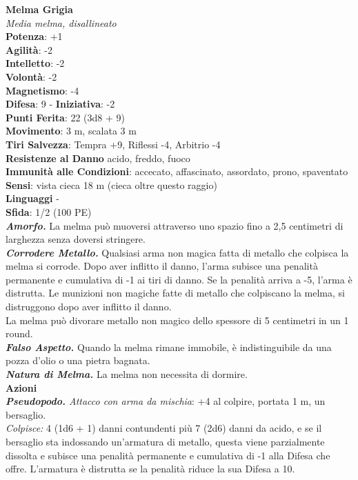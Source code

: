 \begin{multicols}{2}
\medskip\textbf{Melma Grigia}\\
\emph{Media melma, disallineato}\\
\textbf{Potenza}: +1\\
\textbf{Agilità}: -2\\
\textbf{Intelletto}: -2\\
\textbf{Volontà}: -2\\
\textbf{Magnetismo}: -4\\
\textbf{Difesa}: 9 - \textbf{Iniziativa}: -2\\
\textbf{Punti Ferita}: 22 (3d8 + 9)\\
\textbf{Movimento}: 3 m, scalata 3 m\\
\textbf{Tiri Salvezza}: Tempra +9, Riflessi -4, Arbitrio -4\\
\textbf{Resistenze al Danno} acido, freddo, fuoco\\
\textbf{Immunità alle Condizioni}: accecato, affascinato, assordato, prono, spaventato
\textbf{Sensi}: vista cieca 18 m (cieca oltre questo raggio)\\
\textbf{Linguaggi} -\\
\textbf{Sfida}: 1/2 (100 PE)\smallskip\\
\emph{\textbf{Amorfo.}} La melma può muoversi attraverso uno spazio fino a 2,5 centimetri di larghezza senza doversi stringere.\\
\emph{\textbf{Corrodere Metallo.}} Qualsiasi arma non magica fatta di metallo che colpisca la melma si corrode. Dopo aver inflitto il danno, l'arma subisce una penalità permanente e cumulativa di -1 ai tiri di danno. Se la penalità arriva a -5, l'arma è distrutta. Le munizioni non magiche fatte di metallo che colpiscano la melma, si distruggono dopo aver inflitto il danno.\\
La melma può divorare metallo non magico dello spessore di 5 centimetri in un 1 round.\\
\emph{\textbf{Falso Aspetto.}} Quando la melma rimane immobile, è indistinguibile da una pozza d'olio o una pietra bagnata.\\
\emph{\textbf{Natura di Melma.}} La melma non necessita di dormire. \\
\smallskip\textbf{Azioni}\\
\emph{\textbf{Pseudopodo.} Attacco con arma da mischia}: +4 al colpire, portata 1 m, un bersaglio.\\
\emph{Colpisce:} 4 (1d6 + 1) danni contundenti più 7 (2d6) danni da acido, e se il bersaglio sta indossando un'armatura di metallo, questa viene parzialmente dissolta e subisce una penalità permanente e cumulativa di -1 alla Difesa che offre. L'armatura è distrutta se la penalità riduce la sua Difesa a 10.\\

\end{multicols}

